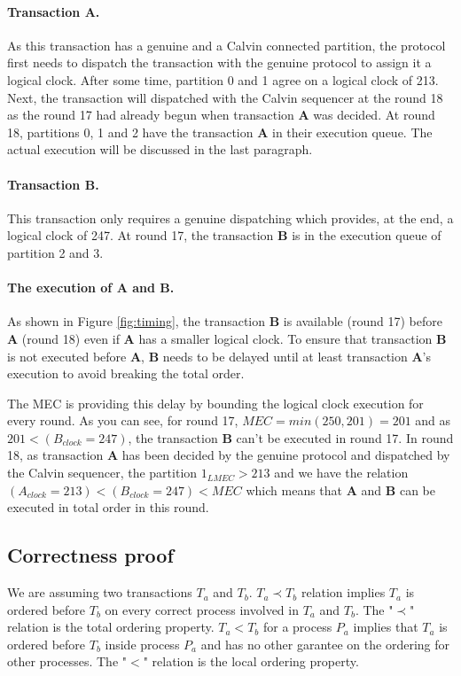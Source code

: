 \documentclass[a4paper, 10pt]{article}
\begin{document}
\paragraph{Transaction A.} As this transaction has a genuine and a Calvin connected partition, the protocol first needs to dispatch
    the transaction with the genuine protocol to assign it a logical clock. After some time, partition 0 and 1 agree on a logical clock
    of 213. Next, the transaction will dispatched with the Calvin sequencer at the round 18 as the round 17 had already begun when
    transaction \textbf{A} was decided. At round 18, partitions 0, 1 and 2 have the transaction \textbf{A} in their execution queue.
    The actual execution will be discussed in the last paragraph.

\paragraph{Transaction B.} This transaction only requires a genuine dispatching which provides, at the end, a logical clock
    of 247. At round 17, the transaction \textbf{B} is in the execution queue of partition 2 and 3.

\paragraph{The execution of A and B.} As shown in Figure \ref{fig:timing}, the transaction \textbf{B} is available (round 17)
    before \textbf{A} (round 18) even if \textbf{A} has a smaller logical clock. To ensure that transaction \textbf{B} is
    not executed before \textbf{A}, \textbf{B} needs to be delayed until at least transaction \textbf{A}'s execution to avoid breaking
    the total order.

    The MEC is providing this delay by bounding the logical clock execution for every round. As you can see,
    for round 17, $MEC=min(250, 201)=201$ and as $201 < (B_{clock} = 247)$,
    the transaction \textbf{B} can't be executed in round 17. In round 18, as transaction \textbf{A} has been decided
    by the genuine protocol and dispatched by the Calvin sequencer,
    the partition $1_{LMEC} > 213$ and we have the relation $(A_{clock} = 213) < (B_{clock} = 247) < MEC$
    which means that \textbf{A} and \textbf{B} can be executed in total order in this round.

\subsection{Correctness proof}
We are assuming two transactions $T_a$ and $T_b$. $T_a \prec T_b$ relation implies $T_a$ is ordered before
$T_b$ on every correct process involved in $T_a$ and $T_b$. The "$\prec$" relation is the total ordering property.
$T_a < T_b$ for a process $P_a$ implies that $T_a$ is ordered before $T_b$ inside process $P_a$ and
has no other garantee on the ordering for other processes. The "$<$" relation is the local ordering property. \\
\end{document}
